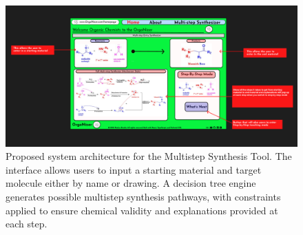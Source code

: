 \documentclass[12pt]{article}
\begin{document}
\begin{figure}[htb] %
    \centering
    \includegraphics[scale=0.50]{OrgoNizerJuniorIs.png}
    \caption{Proposed system architecture for the Multistep Synthesis Tool. 
    The interface allows users to input a starting material and target molecule 
    either by name or drawing. A decision tree engine generates possible 
    multistep synthesis pathways, with constraints applied to ensure chemical 
    validity and explanations provided at each step.}
    \label{fig:orgonizer-architecture} %
\end{figure}



\newpage
\end{document}
